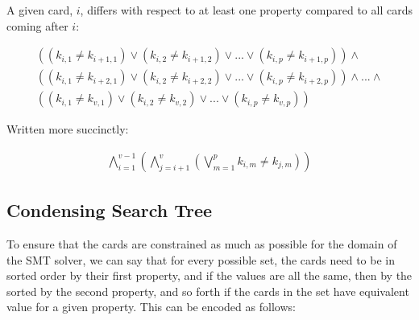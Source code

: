 \documentclass[pageno]{jpaper}
\begin{document}

A given card, $i$, differs with respect to at least one property compared to all cards coming after $i:$

\begin{multline}
	((k_{i,1} \neq k_{i+1,1}) \vee (k_{i,2} \neq k_{i+1,2}) \vee ... \vee (k_{i,p} \neq k_{i+1,p}))  \wedge \\
	((k_{i,1} \neq k_{i+2,1}) \vee (k_{i,2} \neq k_{i+2,2}) \vee ... \vee (k_{i,p} \neq k_{i+2,p}))  \wedge ... \wedge \\ 
	((k_{i,1} \neq k_{v,1}) \vee (k_{i,2} \neq k_{v,2}) \vee ... \vee (k_{i,p} \neq k_{v,p})) 
\end{multline}

Written more succinctly:





\begin{align}
	\bigwedge \limits_{i=1}^{v-1}   \left( \bigwedge \limits_{j=i+1}^{v}   \left( \bigvee \limits_{m = 1}^{p} k_{i,m} \neq k_{j,m} \right)  \right)
\end{align}

\subsection {Condensing Search Tree}

To ensure that the cards are constrained as much as possible for the domain of the SMT solver, we can say that for every possible set, the cards need to be in sorted order by their first property, and if the values are all the same, then by the sorted by the second property, and so forth if the cards in the set have equivalent value for a given property. This can be encoded as follows: 
\end{document}
